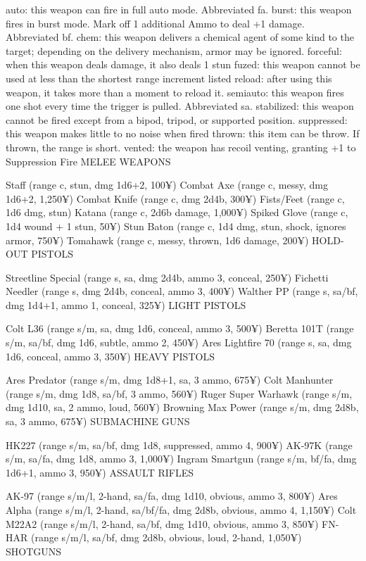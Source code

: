 auto: this weapon can fire in full auto mode. Abbreviated fa.
burst: this weapon fires in burst mode. Mark off 1 additional Ammo to deal +1 damage. Abbreviated bf.
chem: this weapon delivers a chemical agent of some kind to the target; depending on the delivery mechanism, armor may be ignored.
forceful: when this weapon deals damage, it also deals 1 stun
fuzed: this weapon cannot be used at less than the shortest range increment listed
reload: after using this weapon, it takes more than a moment to reload it.
semiauto: this weapon fires one shot every time the trigger is pulled. Abbreviated sa.
stabilized: this weapon cannot be fired except from a bipod, tripod, or supported position.
suppressed: this weapon makes little to no noise when fired
thrown: this item can be throw. If thrown, the range is short.
vented: the weapon has recoil venting, granting +1 to Suppression Fire
MELEE WEAPONS

Staff (range c, stun, dmg 1d6+2, 100¥)
Combat Axe (range c, messy, dmg 1d6+2, 1,250¥)
Combat Knife (range c, dmg 2d4b, 300¥)
Fists/Feet (range c, 1d6 dmg, stun)
Katana (range c, 2d6b damage, 1,000¥)
Spiked Glove (range c, 1d4 wound + 1 stun, 50¥)
Stun Baton (range c, 1d4 dmg, stun, shock, ignores armor, 750¥)
Tomahawk (range c, messy, thrown, 1d6 damage, 200¥)
HOLD-OUT PISTOLS

Streetline Special (range s, sa, dmg 2d4b, ammo 3, conceal, 250¥)
Fichetti Needler (range s, dmg 2d4b, conceal, ammo 3, 400¥)
Walther PP (range s, sa/bf, dmg 1d4+1, ammo 1, conceal, 325¥)
LIGHT PISTOLS

Colt L36 (range s/m, sa, dmg 1d6, conceal, ammo 3, 500¥)
Beretta 101T (range s/m, sa/bf, dmg 1d6, subtle, ammo 2, 450¥)
Ares Lightfire 70 (range s, sa, dmg 1d6, conceal, ammo 3, 350¥)
HEAVY PISTOLS

Ares Predator (range s/m, dmg 1d8+1, sa, 3 ammo, 675¥)
Colt Manhunter (range s/m, dmg 1d8, sa/bf, 3 ammo, 560¥)
Ruger Super Warhawk (range s/m, dmg 1d10, sa, 2 ammo, loud, 560¥)
Browning Max Power (range s/m, dmg 2d8b, sa, 3 ammo, 675¥)
SUBMACHINE GUNS

HK227 (range s/m, sa/bf, dmg 1d8, suppressed, ammo 4, 900¥)
AK-97K (range s/m, sa/fa, dmg 1d8, ammo 3, 1,000¥)
Ingram Smartgun (range s/m, bf/fa, dmg 1d6+1, ammo 3, 950¥)
ASSAULT RIFLES

AK-97 (range s/m/l, 2-hand, sa/fa, dmg 1d10, obvious, ammo 3, 800¥)
Ares Alpha (range s/m/l, 2-hand, sa/bf/fa, dmg 2d8b, obvious, ammo 4, 1,150¥)
Colt M22A2 (range s/m/l, 2-hand, sa/bf, dmg 1d10, obvious, ammo 3, 850¥)
FN-HAR (range s/m/l, sa/bf, dmg 2d8b, obvious, loud, 2-hand, 1,050¥)
SHOTGUNS

